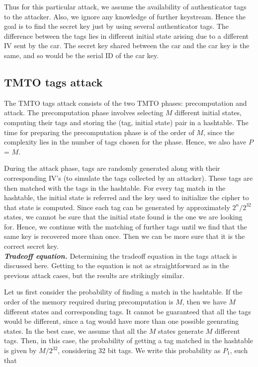 Thus for this particular attack, we assume the availability of authenticator tags to the attacker. Also, we ignore any knowledge of further keystream. Hence the goal is to find the secret key just by using several authenticator tags. The difference between the tags lies in different initial state arising due to a different IV sent by the car. The secret key shared between the car and the car key is the same, and so would be the serial ID of the car key.

\subsection{TMTO tags attack}

The TMTO tags attack consists of the two TMTO phases: precomputation and attack. The precomputation phase involves selecting $M$ different initial states, computing their tags and storing the (tag, initial state) pair in a hashtable. The time for preparing the precomputation phase is of the order of $M$, since the complexity lies in the number of tags chosen for the phase. Hence, we also have $P$ = $M$.

During the attack phase, tags are randomly generated along with their corresponding IV's (to simulate the tags collected by an attacker). These tags are then matched with the tags in the hashtable. For every tag match in the hashtable, the initial state is referred and the key used to initialize the cipher to that state is computed. Since each tag can be generated by approximately $2^n/2^{32}$ states, we cannot be sure that the initial state found is the one we are looking for. Hence, we continue with the matching of further tags until we find that the same key is recovered more than once. Then we can be more sure that it is the correct secret key.\\

\textit{\textbf{Tradeoff equation.}} Determining the tradeoff equation in the tags attack is discussed here. Getting to the equation is not as straightforward as in the previous attack cases, but the results are strikingly similar.

Let us first consider the probability of finding a match in the hashtable. If the order of the memory required during precomputation is $M$, then we have $M$ different states and corresponding tags. It cannot be guaranteed that all the tags would be different, since a tag would have more than one possible geenrating states. In the best case, we assume that all the $M$ states generate $M$ different tags. Then, in this case, the probability of getting a tag matched in the hashtable is given by $M/2^{32}$, considering 32 bit tags. We write this probability as $P_1$, such that

